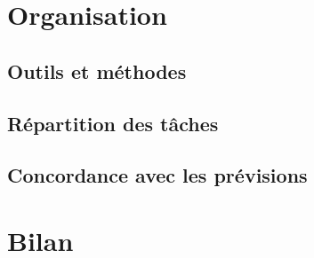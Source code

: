 \documentclass[a4paper,10pt]{report}
\begin{document}
  \chapter{Organisation}

    \section{Outils et méthodes}

    \section{Répartition des tâches}

    \section{Concordance avec les prévisions}

  \chapter{Bilan}

    
\end{document}
